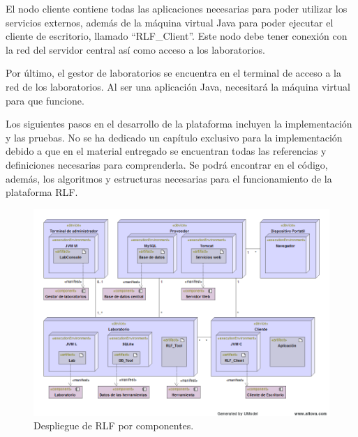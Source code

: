 El nodo cliente contiene todas las aplicaciones necesarias para poder 
utilizar los servicios externos, además de la máquina virtual Java 
para poder ejecutar el cliente de escritorio, llamado ``RLF\_Client''. 
Este nodo debe tener conexión con la red del servidor central así 
como acceso a los laboratorios.

Por último, el gestor de laboratorios se encuentra en el terminal de 
acceso a la red de los laboratorios. Al ser una aplicación Java, 
necesitará la máquina virtual para que funcione.

Los siguientes pasos en el desarrollo de la plataforma incluyen la 
implementación y las pruebas. No se ha dedicado un capítulo exclusivo 
para la implementación debido a que en el material entregado se 
encuentran todas las referencias y definiciones necesarias para 
comprenderla. Se podrá encontrar en el código, además, los 
algoritmos y estructuras necesarias para el funcionamiento de la 
plataforma RLF.

\begin{figure}[h]
	\centering
	\includegraphics[angle=90,scale=0.7]{images/despliegue.png}
	\caption[Despliegue de RLF]{Despliegue de RLF por componentes.}
	\label{fig:despliegue}
\end{figure}

\cleardoublepage
